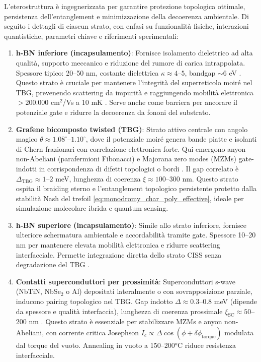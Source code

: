 \documentclass[11pt,a4paper]{article}
\let\oldcite\cite
\renewcommand{\cite}{\protect\oldcite}
\theoremstyle{plain}
\theoremstyle{definition}
\begin{document}
L'eterostruttura è ingegnerizzata per garantire protezione topologica ottimale, persistenza dell'entanglement e minimizzazione della decoerenza ambientale. Di seguito i dettagli di ciascun strato, con enfasi su funzionalità fisiche, interazioni quantistiche, parametri chiave e riferimenti sperimentali:
\vspace{0.2cm}
\begin{enumerate}
    \item \textbf{h-BN inferiore (incapsulamento)}: Fornisce isolamento dielettrico ad alta qualità, supporto meccanico e riduzione del rumore di carica intrappolata. Spessore tipico: 20--50 nm, costante dielettrica $\kappa \approx 4$--$5$, bandgap $\sim 6$ eV \cite{dean2010boron}. Questo strato è cruciale per mantenere l'integrità del superreticolo moiré nel TBG, prevenendo scattering da impurità e raggiungendo mobilità elettronica $>200.000$ cm$^2$/Vs a 10 mK \cite{geim2017van, cao2018unconventional}. Serve anche come barriera per ancorare il potenziale gate e ridurre la decoerenza da fononi del substrato.
\clearpage
    \item \textbf{Grafene bicomposto twisted (TBG)}: Strato attivo centrale con angolo magico $\theta \approx 1.08^\circ$--$1.10^\circ$, dove il potenziale moiré genera bande piatte e isolanti di Chern frazionari con correlazione elettronica forte. Qui emergono anyon non-Abeliani (parafermioni Fibonacci) e Majorana zero modes (MZMs) gate-indotti in corrispondenza di difetti topologici o bordi \cite{cao2018unconventional, jack2020majorana, chew2023higher}. Il gap correlato è $\Delta_{\text{TBG}} \approx 1$--$2$ meV, lunghezza di coerenza $\xi \approx 100$--$300$ nm. Questo strato ospita il braiding eterno e l'entanglement topologico persistente protetto dalla stabilità Nash del trefoil \eqref{eq:monodromy_char_poly_effective}, ideale per simulazione molecolare ibrida e quantum sensing.
\vspace{0.2cm}
    \item \textbf{h-BN superiore (incapsulamento)}: Simile allo strato inferiore, fornisce ulteriore schermatura ambientale e accordabilità tramite gate. Spessore 10--20 nm per mantenere elevata mobilità elettronica e ridurre scattering interfacciale. Permette integrazione diretta dello strato CISS senza degradazione del TBG \cite{geim2017van}.
\vspace{0.2cm}
    \item \textbf{Contatti superconduttori per prossimità}: Superconduttori s-wave (NbTiN, NbSe$_2$ o Al) depositati lateralmente o con sovrapposizione parziale, inducono pairing topologico nel TBG. Gap indotto $\Delta \approx 0.3$--$0.8$ meV (dipende da spessore e qualità interfaccia), lunghezza di coerenza prossimale $\xi_{\text{SC}} \approx 50$--$200$ nm \cite{he2021impurity, thomson2022internally, mourik2012signatures}. Questo strato è essenziale per stabilizzare MZMs e anyon non-Abeliani, con corrente critica Josephson $I_c \propto \Delta \cos(\phi + \delta\phi_{\text{torque}})$ modulata dal torque del vuoto. Annealing in vuoto a 150–200°C riduce resistenza interfacciale.

\end{enumerate}
\end{document}

